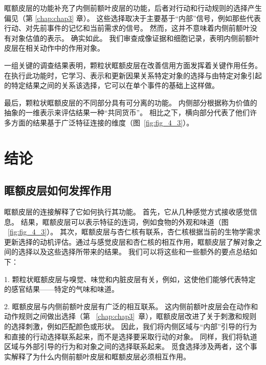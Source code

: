 眶额皮层的功能补充了内侧前额叶皮层的功能，后者对行动和行动规则的选择产生偏见（第 \ref{chap:chap3} 章）。
这些选择取决于主要基于“内部”信号，例如那些代表行动、对先前事件的记忆和当前需求的信号。
然而，这并不意味着内侧前额叶没有对象估值的表示。
确实如此。 我们审查成像证据和细胞记录，表明内侧前额叶皮层在相关动作中的作用对象。\par


一组关键的调查结果表明，颗粒状眶额皮层在改善信用方面发挥着关键作用任务。
在执行此功能时，它学习、表示和更新因果关系特定对象的选择与由特定对象引起的特定结果之间的关系该选择，它可以在单个事件的基础上这样做。\par


最后，颗粒状眶额皮层的不同部分具有可分离的功能。
内侧部分根据称为价值的抽象的一维表示来评估结果一种“共同货币”。
相比之下，横向部分代表了他们许多方面的结果基于广泛特征连接的维度（图~\ref{fig:fig_4_3}）。\par



\section{结论}

\subsection{眶额皮层如何发挥作用}

眶额皮层的连接解释了它如何执行其功能。
首先，它从几种感觉方式接收感觉信息。
结果，眶额皮层可以表示特征的连词，例如食物的外观和味道（图 ~\ref{fig:fig_4_3}）。
其次，眶额皮层与杏仁核有联系，杏仁核根据当前的生物学需求更新选择的动机评估。通过与感觉皮层和杏仁核的相互作用，眶额皮层了解对象之间的选择以及这些选择所带来的结果。
我们可以将这些和一些额外的要点总结如下：\par


1. 颗粒状眶额皮层与嗅觉、味觉和内脏皮层有关，例如，这使他们能够代表特定的感官结果——特定的气味和味道。\par


2. 眶额皮层与内侧前额叶皮层有广泛的相互联系。
这内侧前额叶皮层会在动作和动作规则之间做出选择（第 ~\ref{chap:chap3}~章），眶额皮层改进了关于刺激和规则的选择刺激，例如匹配颜色或形状。
因此，我们将内侧区域与“内部”引导的行为和直接的行动选择联系起来，而不是选择要采取行动的对象。
同样，我们将轨道区域与外部引导的行为和对象之间的选择联系起来。
觅食选择涉及两者，这个事实解释了为什么内侧前额叶皮层和眶额皮层必须相互作用。\par


